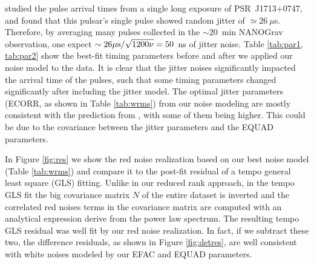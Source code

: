 {%


\citet{sc12} studied the pulse arrival times from a single long exposure of
PSR~J1713+0747, and found that this pulsar's single pulse showed random jitter of
$\simeq26~\mu$s. Therefore, by averaging many pulses collected in the
$\sim20$~min NANOGrav observation, one expect $\sim26\mu{\rm s}/\sqrt{1200\nu}=50$~ns of jitter noise. 
Table \ref{tab:par1, tab:par2} show the best-fit timing parameters before and
after we applied our noise model to the data. It is clear that the jitter
noises significantly impacted the arrival time of the pulses, such that 
some timing parameters changed significantly after including the jitter model.
The optimal jitter parameters (ECORR, as shown in Table \ref{tab:wrms}) from
our noise modeling are mostly consistent with the prediction from
\citet{sc12}, with some of them being higher. This could be due to the
covariance between the jitter parameters and the EQUAD parameters.

In Figure \ref{fig:res} we show the red noise realization based on our best
noise model (Table \ref{tab:wrms}) and compare it to the post-fit residual of
a {\sc tempo} general least square (GLS) fitting. Unlike in our reduced rank
approach, in the {\sc tempo} 
GLS fit the big covariance matrix $N$ of the entire dataset
is inverted and the correlated red noises terms in the covariance matrix are 
computed with an analytical expression derive from the power law spectrum.
The resulting {\sc tempo } GLS residual was well fit by our red noise realization.
In fact, if we subtract these two, the difference residuals, as shown in
Figure \ref{fig:detres}, are well consistent
with white noises modeled by our EFAC and EQUAD parameters.

}
